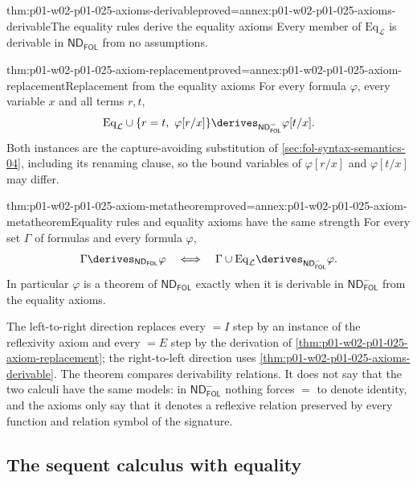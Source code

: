 \begin{hbtheorem}{thm:p01-w02-p01-025-axioms-derivable}{proved=annex:p01-w02-p01-025-axioms-derivable}{The equality rules derive the equality axioms}
Every member of \(\mathrm{Eq}_{\mathcal L}\) is derivable in
\(\mathsf{ND}_{\mathsf{FOL}}\) from no assumptions.
\end{hbtheorem}

\begin{hbtheorem}{thm:p01-w02-p01-025-axiom-replacement}{proved=annex:p01-w02-p01-025-axiom-replacement}{Replacement from the equality axioms}
For every formula \(\varphi\), every variable \(x\) and all terms \(r,t\),
\[
 \mathrm{Eq}_{\mathcal L}\cup\{r=t,\ \varphi[r/x]\}
 \derives_{\mathsf{ND}^{-}_{\mathsf{FOL}}}\varphi[t/x].
\]
Both instances are the capture-avoiding substitution of
\cref{sec:fol-syntax-semantics-04}, including its renaming clause, so the
bound variables of \(\varphi[r/x]\) and \(\varphi[t/x]\) may differ.
\end{hbtheorem}

\begin{hbtheorem}{thm:p01-w02-p01-025-axiom-metatheorem}{proved=annex:p01-w02-p01-025-axiom-metatheorem}{Equality rules and equality axioms have the same strength}
For every set \(\Gamma\) of formulas and every formula \(\varphi\),
\[
 \Gamma\derives_{\mathsf{ND}_{\mathsf{FOL}}}\varphi
 \quad\Longleftrightarrow\quad
 \Gamma\cup\mathrm{Eq}_{\mathcal L}
   \derives_{\mathsf{ND}^{-}_{\mathsf{FOL}}}\varphi.
\]
In particular \(\varphi\) is a theorem of \(\mathsf{ND}_{\mathsf{FOL}}\)
exactly when it is derivable in \(\mathsf{ND}^{-}_{\mathsf{FOL}}\) from the
equality axioms.
\end{hbtheorem}

The left-to-right direction replaces every \(=I\) step by an instance of the
reflexivity axiom and every \(=E\) step by the derivation of
\cref{thm:p01-w02-p01-025-axiom-replacement}; the right-to-left direction
uses \cref{thm:p01-w02-p01-025-axioms-derivable}.  The theorem compares
derivability relations.  It does not say that the two calculi have the same
models: in \(\mathsf{ND}^{-}_{\mathsf{FOL}}\) nothing forces \(=\) to denote
identity, and the axioms only say that it denotes a reflexive relation
preserved by every function and relation symbol of the signature.

\subsection{The sequent calculus with equality}
\label{sec:p01-w02-p01-025-lk}

